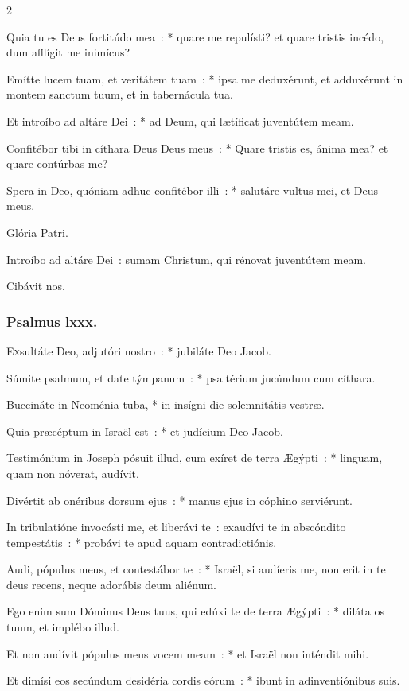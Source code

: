 \documentclass[9pt,twoside]{extarticle}
\begin{document}
\begin{multicols}{2}
{Quia tu es Deus fortitúdo mea~: * quare me repulísti? et quare tristis incédo, dum afflígit me inimícus?

Emítte lucem tuam, et veritátem tuam~: * ipsa me deduxérunt, et adduxérunt in montem sanctum tuum, et in tabernácula tua.

Et introíbo ad altáre Dei~: * ad Deum, qui lætíficat juventútem meam.

Confitébor tibi in cíthara Deus Deus meus~: * Quare tristis es, ánima mea? et quare contúrbas me?

Spera in Deo, quóniam adhuc confitébor illi~: * salutáre vultus mei, et Deus meus.

Glória Patri.

\begin{tightlist}{}
\item {} Introíbo ad altáre Dei~: sumam Christum, qui rénovat juventútem meam.
\item {} Cibávit nos.
\end{tightlist}

\subsubsection*{\center Psalmus lxxx.}
\lettrine{E}xsultáte Deo, adjutóri nostro~: * jubiláte Deo Jacob.

Súmite psalmum, et date týmpanum~: * psaltérium jucúndum cum cíthara.

Buccináte in Neoménia tuba, * in insígni die solemnitátis vestræ.

Quia præcéptum in Israël est~: * et judícium Deo Jacob.

Testimónium in Joseph pósuit illud, cum exíret de terra Ægýpti~: * linguam, quam non nóverat, audívit.

Divértit ab onéribus dorsum ejus~: * manus ejus in cóphino serviérunt.

In tribulatióne invocásti me, et liberávi te~: exaudívi te in abscóndito tempestátis~: * probávi te apud aquam contradictiónis.

Audi, pópulus meus, et contestábor te~: * Israël, si audíeris me, non erit in te deus recens, neque adorábis deum aliénum.

Ego enim sum Dóminus Deus tuus, qui edúxi te de terra Ægýpti~: * diláta os tuum, et implébo illud.

Et non audívit pópulus meus vocem meam~: * et Israël non inténdit mihi.

Et dimísi eos secúndum desidéria cordis eórum~: * ibunt in adinventiónibus suis.

}
\end{multicols}
\end{document}
